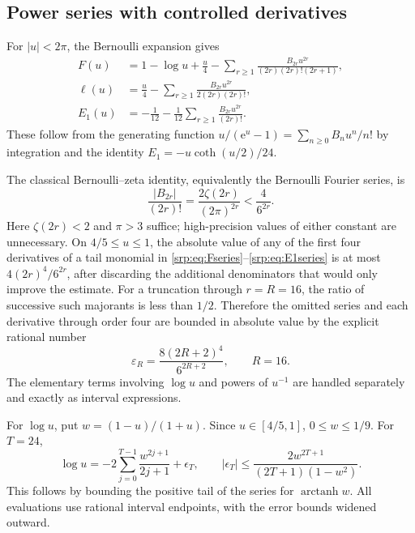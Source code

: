 \documentclass[11pt,a4paper]{article}
\numberwithin{equation}{section}
\theoremstyle{definition}
\theoremstyle{remark}
\newcommand{\e}{\mathrm e}
\begin{document}
\subsection{Power series with controlled derivatives}
For $|u|<2\pi$, the Bernoulli expansion gives
\begin{align}
 F(u)&=1-\log u+\frac u4
 -\sum_{r\ge1}\frac{B_{2r}u^{2r}}
 {(2r)(2r)!(2r+1)},\label{srp:eq:Fseries}\\
 \ell(u)&=\frac u4
 -\sum_{r\ge1}\frac{B_{2r}u^{2r}}{2(2r)(2r)!},
 \label{srp:eq:ellseries}\\
 E_1(u)&=-\frac1{12}
 -\frac1{12}\sum_{r\ge1}\frac{B_{2r}u^{2r}}{(2r)!}.
 \label{srp:eq:E1series}
\end{align}
These follow from the generating function
$u/(\e^u-1)=\sum_{n\ge0}B_nu^n/n!$ by integration and the identity
$E_1=-u\coth(u/2)/24$.

The classical Bernoulli--zeta identity, equivalently the Bernoulli
Fourier series, is \cite{dlmfBernoulli}
\begin{equation}
 \frac{|B_{2r}|}{(2r)!}
 =\frac{2\zeta(2r)}{(2\pi)^{2r}}
 <\frac4{6^{2r}}.
 \label{srp:eq:Bbound}
\end{equation}
Here $\zeta(2r)<2$ and $\pi>3$ suffice; high-precision values of either
constant are unnecessary. On $4/5\le u\le1$, the absolute value of any
of the first four derivatives of a tail monomial in
\eqref{srp:eq:Fseries}--\eqref{srp:eq:E1series} is at most
$4(2r)^4/6^{2r}$, after discarding the additional denominators that would
only improve the estimate. For a truncation through $r=R=16$, the ratio
of successive such majorants is less than $1/2$. Therefore the omitted
series and each derivative through order four are bounded in absolute
value by the explicit rational number
\begin{equation}
 \varepsilon_R=\frac{8(2R+2)^4}{6^{2R+2}},\qquad R=16.
 \label{srp:eq:eps}
\end{equation}
The elementary terms involving $\log u$ and powers of $u^{-1}$ are
handled separately and exactly as interval expressions.

For $\log u$, put $w=(1-u)/(1+u)$. Since $u\in[4/5,1]$, $0\le w\le1/9$.
For $T=24$,
\begin{equation}
 \log u=-2\sum_{j=0}^{T-1}\frac{w^{2j+1}}{2j+1}+\epsilon_T,
 \qquad
 |\epsilon_T|\le
 \frac{2w^{2T+1}}{(2T+1)(1-w^2)}.
 \label{srp:eq:log-bound}
\end{equation}
This follows by bounding the positive tail of the series for
$\operatorname{arctanh}w$. All evaluations use rational interval
endpoints, with the error bounds widened outward.
\end{document}
